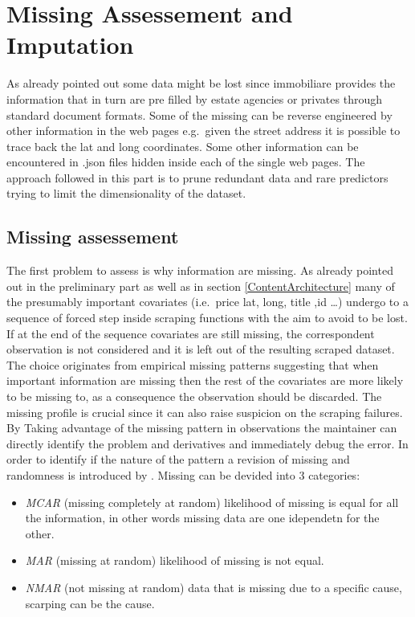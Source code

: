 \documentclass[
  12pt,
  a4paper,
  oneside]{book}
\providecommand{\tightlist}{%
  \setlength{\itemsep}{0pt}\setlength{\parskip}{0pt}}
\theoremstyle{definition}
\theoremstyle{definition}
\theoremstyle{definition}
\theoremstyle{remark}
\begin{document}
\hypertarget{missassimp}{%
\section{Missing Assessement and Imputation}\label{missassimp}}

As already pointed out some data might be lost since immobiliare provides the information that in turn are pre filled by estate agencies or privates through standard document formats. Some of the missing can be reverse engineered by other information in the web pages e.g.~given the street address it is possible to trace back the lat and long coordinates. Some other information can be encountered in .json files hidden inside each of the single web pages.
The approach followed in this part is to prune redundant data and rare predictors trying to limit the dimensionality of the dataset.

\hypertarget{missing-assessement}{%
\subsection{Missing assessement}\label{missing-assessement}}

The first problem to assess is why information are missing. As already pointed out in the preliminary part as well as in section \ref{ContentArchitecture} many of the presumably important covariates (i.e.~price lat, long, title ,id \ldots) undergo to a sequence of forced step inside scraping functions with the aim to avoid to be lost. If at the end of the sequence covariates are still missing, the correspondent observation is not considered and it is left out of the resulting scraped dataset. The choice originates from empirical missing patterns suggesting that when important information are missing then the rest of the covariates are more likely to be missing to, as a consequence the observation should be discarded.
The missing profile is crucial since it can also raise suspicion on the scraping failures. By Taking advantage of the missing pattern in observations the maintainer can directly identify the problem and derivatives and immediately debug the error. In order to identify if the nature of the pattern a revision of missing and randomness is introduced by \citet{Little}.
Missing can be devided into 3 categories:

\begin{itemize}
\tightlist
\item
  \emph{MCAR} (missing completely at random) likelihood of missing is equal for all the information, in other words missing data are one idependetn for the other.
\item
  \emph{MAR} (missing at random) likelihood of missing is not equal.
\item
  \emph{NMAR} (not missing at random) data that is missing due to a specific cause, scarping can be the cause.
\end{itemize}
\end{document}
